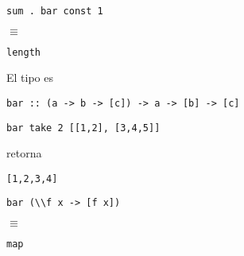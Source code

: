 \documentclass{gift}
\begin{document}
\begin{giftMO}
\item \begin{giftFragmento}
\end  {giftFragmento}

\verb!sum . bar const 1!
\begin{giftFragmento}
\end  {giftFragmento}

$\equiv$
\begin{giftFragmento}
\end  {giftFragmento}

\verb!length!
\begin{giftFragmento}
\end  {giftFragmento}


\item \begin{giftFragmento}
El tipo es\end  {giftFragmento}

\verb!bar :: (a -> b -> [c]) -> a -> [b] -> [c]!
\begin{giftFragmento}
\end  {giftFragmento}


\item \begin{giftFragmento}
\end  {giftFragmento}

\verb!bar take 2 [[1,2], [3,4,5]]!
\begin{giftFragmento}
retorna\end  {giftFragmento}

\verb![1,2,3,4]!
\begin{giftFragmento}
\end  {giftFragmento}


\item \begin{giftFragmento}
\end  {giftFragmento}

\verb!bar (\\f x -> [f x])!
\begin{giftFragmento}
\end  {giftFragmento}

$\equiv$
\begin{giftFragmento}
\end  {giftFragmento}

\verb!map!
\begin{giftFragmento}
\end  {giftFragmento}


\end  {giftMO}
\end{document}
